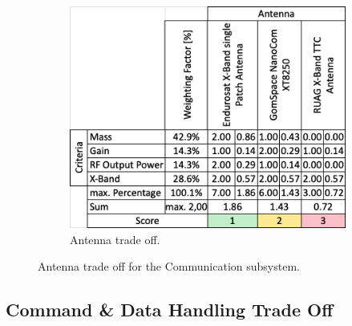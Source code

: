\begin{figure}[h]
\begin{subfigure}[b]{0.49\textwidth}
         \label{fig:Values_Rec}
     \end{subfigure}
     \hfill
     \begin{subfigure}[b]{0.49\textwidth}
         \centering
         \includegraphics[width=\textwidth]{Media/Trade_off/Antenna/TradeOff_Ant.png}
         \caption{Antenna trade off.}
         \label{fig:TradeOff_Rec}
     \end{subfigure}
     \hfill
     \caption{Antenna trade off for the Communication subsystem.}
     \label{TrOff_Trans}
\end{figure}

\subsection{Command \& Data Handling Trade Off}

